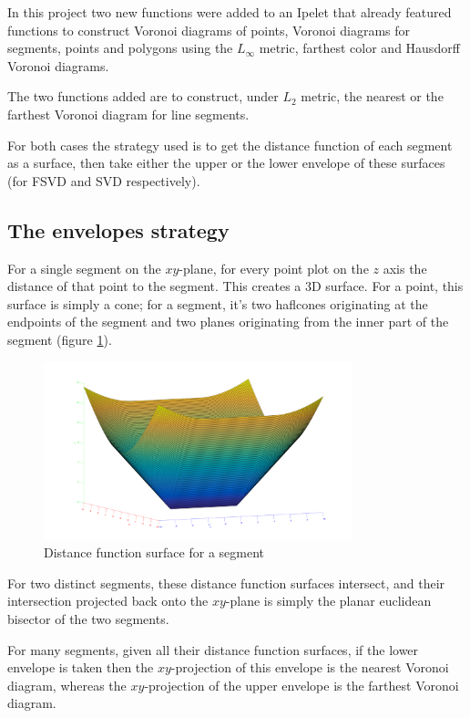 \documentclass[11pt,a4paper,english]{article}
\begin{document}
	In this project two new functions were added to an Ipelet that already featured functions to construct Voronoi diagrams of points, Voronoi diagrams for segments, points and polygons using the \(L_{\infty}\) metric, farthest color and Hausdorff Voronoi diagrams.\par
	The two functions added are to construct, under \(L_{2}\) metric, the nearest or the farthest Voronoi diagram for line segments.\par
	For both cases the strategy used is to get the distance function of each segment as a surface, then take either the upper or the lower envelope of these surfaces (for FSVD and SVD respectively).
	
	\subsection{The envelopes strategy}
	For a single segment on the \(xy\)-plane, for every point plot on the \(z\) axis the distance of that point to the segment. This creates a 3D surface. For a point, this surface is simply a cone; for a segment, it's two haflcones originating at the endpoints of the segment and two planes originating from the inner part of the segment (figure \ref{fig:distance_function}).\par
	\begin{figure}[h]
    \centering
    \includegraphics[width=0.8\textwidth]{distance_function}
    \caption{Distance function surface for a segment\protect\footnotemark \label{fig:distance_function}}
	\end{figure}
	For two distinct segments, these distance function surfaces intersect, and their intersection projected back onto the \(xy\)-plane is simply the planar euclidean bisector of the two segments.\par
	For many segments, given all their distance function surfaces, if the lower envelope is taken then the \(xy\)-projection of this envelope is the nearest Voronoi diagram, whereas the \(xy\)-projection of the upper envelope is the farthest Voronoi diagram.
	
\end{document}
